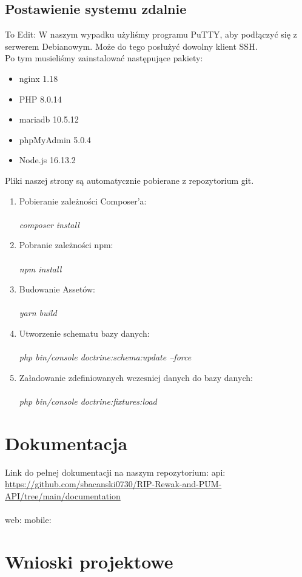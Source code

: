 \documentclass{article}
\begin{document}
\subsection{Postawienie systemu zdalnie}
To Edit:
W naszym wypadku użyliśmy programu PuTTY, aby podłączyć się z serwerem Debianowym. Może do tego posłużyć dowolny klient SSH.\\
Po tym musieliśmy zainstalować następujące pakiety:
\begin{itemize}
\item nginx 1.18
\item PHP 8.0.14
\item mariadb 10.5.12
\item phpMyAdmin 5.0.4
\item Node.js 16.13.2
\end{itemize}
Pliki naszej strony są automatycznie pobierane z repozytorium git.
\begin{enumerate}
\item Pobieranie zależności Composer'a: \\\\
 \emph{composer install
} \\
 \item Pobranie zależności npm:\\\\
 \emph{npm install
} \\
 \item Budowanie Assetów: \\\\
 \emph{yarn build
} \\
 \item Utworzenie schematu bazy danych: \\\\
 \emph{php bin/console doctrine:schema:update --force
} \\
 \item Załadowanie zdefiniowanych wczesniej danych do bazy danych: \\\\
 \emph{php bin/console doctrine:fixtures:load
} \\

  \end{enumerate}


\section{Dokumentacja}
Link do pełnej dokumentacji na naszym repozytorium: 
api: \url{https://github.com/sbacanski0730/RIP-Rewak-and-PUM-API/tree/main/documentation}\\\\
web:
mobile:

\section{Wnioski projektowe}
\end{document}
